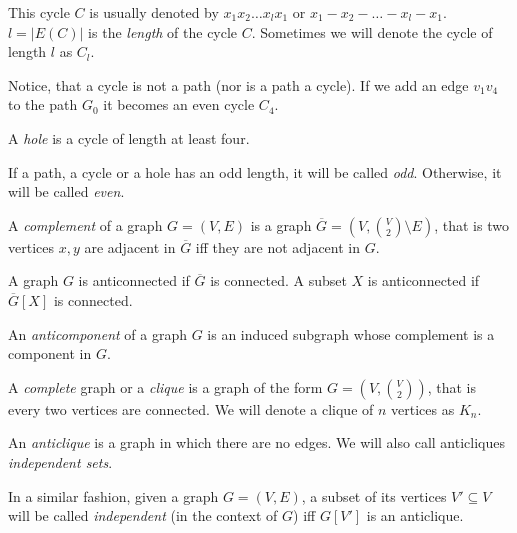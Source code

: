 This cycle $C$ is usually denoted by $x_1x_2\ldots x_lx_1$ or $x_1 - x_2 - \ldots - x_l - x_1$. $l = |E(C)|$ is the \emph{length} of the cycle $C$. Sometimes we will denote the cycle of length $l$ as $C_l$.

Notice, that a cycle is not a path (nor is a path a cycle). If we add an edge $v_1v_4$ to the path $G_0$ it becomes an even cycle $C_4$.

\begin{defn}[hole]
  A \emph{hole} is a cycle of length at least four.
\end{defn}

If a path, a cycle or a hole has an odd length, it will be called \emph{odd}. Otherwise, it will be called \emph{even}.

\begin{defn}[complement]
  A \emph{complement} of a graph $G = (V, E)$ is a graph $\overline{G} = (V, {V \choose 2} \setminus E)$, that is two vertices $x, y$ are adjacent in $\overline{G}$ iff they are not adjacent in $G$.
\end{defn}


\begin{defn}
  A graph $G$ is anticonnected if $\overline{G}$ is connected.
  A subset $X$ is anticonnected if $\overline{G}[X]$ is connected.
\end{defn}

\begin{defn}[anticomponent]
  An \emph{anticomponent} of a graph $G$ is an induced subgraph whose complement is a component in $G$.
\end{defn}

\begin{defn}[clique]
  A \emph{complete} graph or a \emph{clique} is a graph of the form $G = (V, {V \choose 2})$, that is every two vertices are connected. We will denote a clique of $n$ vertices as $K_n$.
\end{defn}

\begin{defn}[anticlique]
  An \emph{anticlique} is a graph in which there are no edges. We will also call anticliques \emph{independent sets}. 
\end{defn}
In a similar fashion, given a graph $G = (V, E)$, a subset of its vertices $V' \subseteq V$ will be called \emph{independent} (in the context of $G$) iff $G[V']$ is an anticlique.

